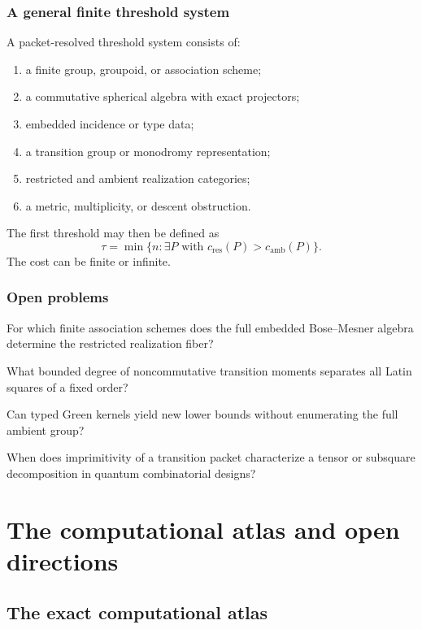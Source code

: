 \subsection{A general finite threshold system}
A packet-resolved threshold system consists of:
\begin{enumerate}
\item a finite group, groupoid, or association scheme;
\item a commutative spherical algebra with exact projectors;
\item embedded incidence or type data;
\item a transition group or monodromy representation;
\item restricted and ambient realization categories;
\item a metric, multiplicity, or descent obstruction.
\end{enumerate}

The first threshold may then be defined as
\[
\tau=
\min\{n:\exists P\text{ with }c_{\mathrm{res}}(P)>c_{\mathrm{amb}}(P)\}.
\]
The cost can be finite or infinite.

\subsection{Open problems}
\begin{question}
For which finite association schemes does the full embedded Bose--Mesner algebra determine the restricted realization fiber?
\end{question}
\begin{question}
What bounded degree of noncommutative transition moments separates all Latin squares of a fixed order?
\end{question}
\begin{question}
Can typed Green kernels yield new lower bounds without enumerating the full ambient group?
\end{question}
\begin{question}
When does imprimitivity of a transition packet characterize a tensor or subsquare decomposition in quantum combinatorial designs?
\end{question}

\chapter{The computational atlas and open directions}
\section{The exact computational atlas}\label{g:ch:atlas}


